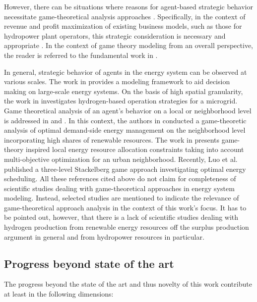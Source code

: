 \documentclass[review]{elsarticle}
\begin{document}
However, there can be situations where reasons for agent-based strategic behavior necessitate game-theoretical analysis approaches \cite{wei2017stackelberg}. Specifically, in the context of revenue and profit maximization of existing business models, such as those for hydropower plant operators, this strategic consideration is necessary and appropriate \cite{fleten2007stochastic}. In the context of game theory modeling from an overall perspective, the reader is referred to the fundamental work in \cite{gintis2000game}.\vspace{0.3cm}

In general, strategic behavior of agents in the energy system can be observed at various scales. The work in \cite{girones2015strategic} provides a modeling framework to aid decision making on large-scale energy systems. On the basis of high spatial granularity, the work in \cite{khojasteh2020robust} investigates hydrogen-based operation strategies for a microgrid. Game theoretical analysis of an agent's behavior on a local or neighborhood level is addressed in \cite{jing2018multi} and \cite{fleischhacker2018sharing}. In this context, the authors in \cite{fernandez2018game} conducted a game-theoretic analysis of optimal demand-side energy management on the neighborhood level incorporating high shares of renewable resources. The work in \cite{jing2018multi} presents game-theory inspired local energy resource allocation constraints taking into account multi-objective optimization for an urban neighborhood. Recently, Luo et al. \cite{luo2020energy} published a three-level Stackelberg game approach investigating optimal energy scheduling. All these references cited above do not claim for completeness of scientific studies dealing with game-theoretical approaches in energy system modeling. Instead, selected studies are mentioned to indicate the relevance of game-theoretical approach analysis in the context of this work's focus. It has to be pointed out, however, that there is a lack of scientific studies dealing with hydrogen production from renewable energy resources off the surplus production argument in general and from hydropower resources in particular.

\subsection{Progress beyond state of the art}
The progress beyond the state of the art and thus novelty of this work contribute at least in the following dimensions:
\end{document}
